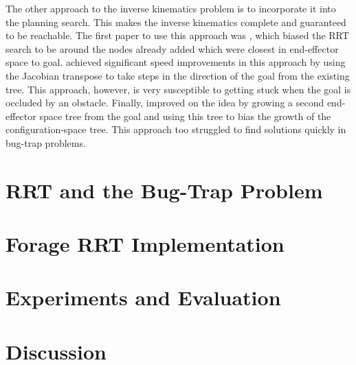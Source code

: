\documentclass[conference]{IEEEtran}
\begin{document}
The other approach to the inverse kinematics problem is to incorporate it into the planning search. This makes the inverse kinematics
complete and guaranteed to be reachable. The first paper to use this approach was \cite{bertram06}, which biased the RRT search to be around
the nodes already added which were closest in end-effector space to goal. \cite{vande07} achieved significant speed improvements in this
approach by using the Jacobian transpose to take steps in the direction of the goal from the existing tree. This approach, however, is very
susceptible to getting stuck when the goal is occluded by an obstacle. Finally, \cite{diankov08} improved on the idea by growing a second
end-effector space tree from the goal and using this tree to bias the growth of the configuration-space tree. This approach too struggled
to find solutions quickly in bug-trap problems.
 
\section{RRT and the Bug-Trap Problem}

\section{Forage RRT Implementation}

\section{Experiments and Evaluation}

\section{Discussion}



\end{document}
